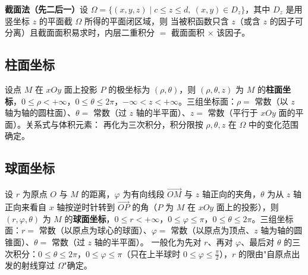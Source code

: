 \textbf{截面法（先二后一）}\quad 设 $\Omega=\{(x,y,z)\mid c\le z\le d,\ (x,y)\in D_z\}$，其中 $D_z$ 是用竖坐标 $z$ 的平面截 $\Omega$ 所得的平面闭区域，则
当被积函数只含 $z$（或含 $z$ 的因子可分离）且截面面积易求时，内层二重积分 $=$ 截面面积 $\times$ 该因子。


\subsection{柱面坐标}

设点 $M$ 在 $xOy$ 面上投影 $P$ 的极坐标为 $(\rho,\theta)$，则 $(\rho,\theta,z)$ 为 $M$ 的\textbf{柱面坐标}，$0\le\rho<+\infty$，$0\le\theta\le2\pi$，$-\infty<z<+\infty$。三组坐标面：$\rho=$ 常数（以 $z$ 轴为轴的圆柱面）、$\theta=$ 常数（过 $z$ 轴的半平面）、$z=$ 常数（平行于 $xOy$ 面的平面）。关系式与体积元素：
再化为三次积分，积分限按 $\rho,\theta,z$ 在 $\Omega$ 中的变化范围确定。


\subsection{球面坐标}

设 $r$ 为原点 $O$ 与 $M$ 的距离，$\varphi$ 为有向线段 $\overrightarrow{OM}$ 与 $z$ 轴正向的夹角，$\theta$ 为从 $z$ 轴正向来看自 $x$ 轴按逆时针转到 $\overrightarrow{OP}$ 的角（$P$ 为 $M$ 在 $xOy$ 面上的投影），则 $(r,\varphi,\theta)$ 为 $M$ 的\textbf{球面坐标}，$0\le r<+\infty$，$0\le\varphi\le\pi$，$0\le\theta\le2\pi$。三组坐标面：$r=$ 常数（以原点为球心的球面）、$\varphi=$ 常数（以原点为顶点、$z$ 轴为轴的圆锥面）、$\theta=$ 常数（过 $z$ 轴的半平面）。
一般化为先对 $r$、再对 $\varphi$、最后对 $\theta$ 的三次积分：$0\le\theta\le2\pi$，$0\le\varphi\le\pi$（只在上半球时 $0\le\varphi\le\frac{\pi}{2}$），$r$ 的限由"自原点出发的射线穿过 $\Omega$"确定。

